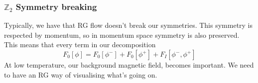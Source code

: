 \subsubsection{$ \mathbb{ Z} _ 2 $ Symmetry breaking } 
Typically, we have that RG flow doesn't break our 
symmetries. This symmetry is respected by momentum, 
so in momentum space symmetry is also preserved. This means 
that every term in our decomposition 
\[
 F_ 0 [ \phi ] = F_ 0 [ \phi ^ - ]  + F_0 [ \phi ^ + ] + F_I [ \phi ^ - , \phi ^ + ] 
\] At low temperature, 
our background magnetic field, becomes important. 
We need to have an RG way of visualising what's going on. 


\pagebreak 
